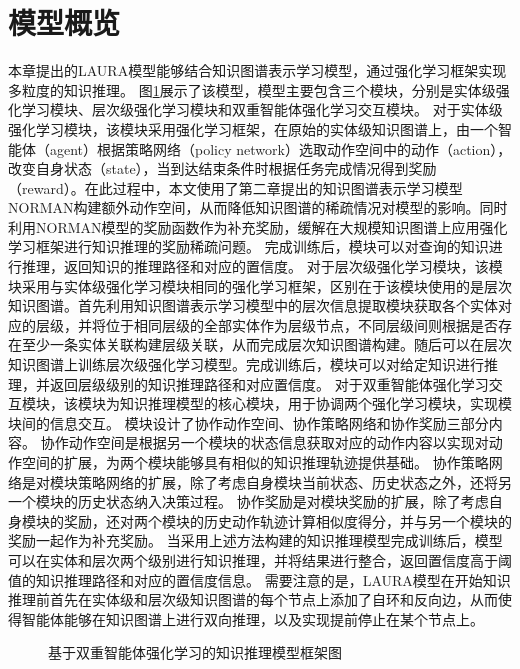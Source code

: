 \documentclass[algorithmlist, AutoFakeBold, AutoFakeSlant, figurelist, tablelist, nomlist, engineering]{seuthesix}
\begin{document}
\section{模型概览}
本章提出的LAURA模型能够结合知识图谱表示学习模型，通过强化学习框架实现多粒度的知识推理。
图\ref{3_LAURA}展示了该模型，模型主要包含三个模块，分别是实体级强化学习模块、层次级强化学习模块和双重智能体强化学习交互模块。
对于实体级强化学习模块，该模块采用强化学习框架，在原始的实体级知识图谱上，由一个智能体（agent）根据策略网络（policy network）选取动作空间中的动作（action），改变自身状态（state），当到达结束条件时根据任务完成情况得到奖励（reward）。在此过程中，本文使用了第二章提出的知识图谱表示学习模型NORMAN构建额外动作空间，从而降低知识图谱的稀疏情况对模型的影响。同时利用NORMAN模型的奖励函数作为补充奖励，缓解在大规模知识图谱上应用强化学习框架进行知识推理的奖励稀疏问题。
完成训练后，模块可以对查询的知识进行推理，返回知识的推理路径和对应的置信度。
对于层次级强化学习模块，该模块采用与实体级强化学习模块相同的强化学习框架，区别在于该模块使用的是层次知识图谱。首先利用知识图谱表示学习模型中的层次信息提取模块获取各个实体对应的层级，并将位于相同层级的全部实体作为层级节点，不同层级间则根据是否存在至少一条实体关联构建层级关联，从而完成层次知识图谱构建。随后可以在层次知识图谱上训练层次级强化学习模型。完成训练后，模块可以对给定知识进行推理，并返回层级级别的知识推理路径和对应置信度。
对于双重智能体强化学习交互模块，该模块为知识推理模型的核心模块，用于协调两个强化学习模块，实现模块间的信息交互。
模块设计了协作动作空间、协作策略网络和协作奖励三部分内容。
协作动作空间是根据另一个模块的状态信息获取对应的动作内容以实现对动作空间的扩展，为两个模块能够具有相似的知识推理轨迹提供基础。
协作策略网络是对模块策略网络的扩展，除了考虑自身模块当前状态、历史状态之外，还将另一个模块的历史状态纳入决策过程。
协作奖励是对模块奖励的扩展，除了考虑自身模块的奖励，还对两个模块的历史动作轨迹计算相似度得分，并与另一个模块的奖励一起作为补充奖励。
当采用上述方法构建的知识推理模型完成训练后，模型可以在实体和层次两个级别进行知识推理，并将结果进行整合，返回置信度高于阈值的知识推理路径和对应的置信度信息。
需要注意的是，LAURA模型在开始知识推理前首先在实体级和层次级知识图谱的每个节点上添加了自环和反向边，从而使得智能体能够在知识图谱上进行双向推理，以及实现提前停止在某个节点上。
\begin{figure}
  \centering

  \caption{基于双重智能体强化学习的知识推理模型框架图}
  \label{3_LAURA}
\end{figure}
\end{document}
